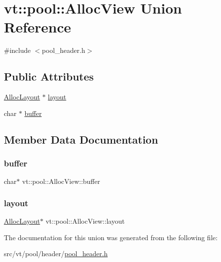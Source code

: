 \hypertarget{unionvt_1_1pool_1_1_alloc_view}{}\section{vt\+:\+:pool\+:\+:Alloc\+View Union Reference}
\label{unionvt_1_1pool_1_1_alloc_view}


{\ttfamily \#include $<$pool\+\_\+header.\+h$>$}

\subsection*{Public Attributes}
\begin{DoxyCompactItemize}
\item 
\hyperlink{structvt_1_1pool_1_1_alloc_layout}{Alloc\+Layout} $\ast$ \hyperlink{unionvt_1_1pool_1_1_alloc_view_a332dd2cdc50fc0101cb07a00f692daec}{layout}
\item 
char $\ast$ \hyperlink{unionvt_1_1pool_1_1_alloc_view_ac3bfb82a8b9841cf3c4bd9aace2e559b}{buffer}
\end{DoxyCompactItemize}


\subsection{Member Data Documentation}
\mbox{\label{unionvt_1_1pool_1_1_alloc_view_ac3bfb82a8b9841cf3c4bd9aace2e559b}} 
\subsubsection{\texorpdfstring{buffer}{buffer}}
{\footnotesize\ttfamily char$\ast$ vt\+::pool\+::\+Alloc\+View\+::buffer}

\mbox{\label{unionvt_1_1pool_1_1_alloc_view_a332dd2cdc50fc0101cb07a00f692daec}} 
\subsubsection{\texorpdfstring{layout}{layout}}
{\footnotesize\ttfamily \hyperlink{structvt_1_1pool_1_1_alloc_layout}{Alloc\+Layout}$\ast$ vt\+::pool\+::\+Alloc\+View\+::layout}



The documentation for this union was generated from the following file\+:\begin{DoxyCompactItemize}
\item 
src/vt/pool/header/\hyperlink{pool__header_8h}{pool\+\_\+header.\+h}\end{DoxyCompactItemize}
